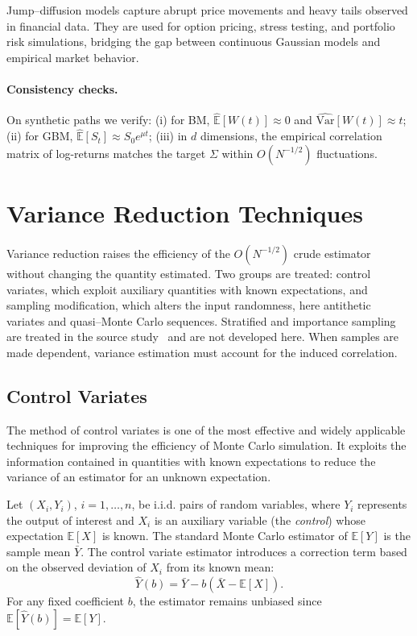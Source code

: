 \begin{remark}[Applications]
Jump--diffusion models capture abrupt price movements and heavy tails observed in financial data.  
They are used for option pricing, stress testing, and portfolio risk simulations, bridging the gap between continuous Gaussian models and empirical market behavior.
\end{remark}

\paragraph{Consistency checks.}
On synthetic paths we verify: (i) for BM, \( \hat{\mathbb E}[W(t)]\approx0\) and \(\widehat{\mathrm{Var}}[W(t)]\approx t\);
(ii) for GBM, \( \hat{\mathbb E}[S_t]\approx S_0 e^{\mu t}\);
(iii) in \(d\) dimensions, the empirical correlation matrix of log-returns matches the target \(\Sigma\) within \(O(N^{-1/2})\) fluctuations.


\section{Variance Reduction Techniques}\label{sec:mc-variance-reduction}

Variance reduction raises the efficiency of the $O(N^{-1/2})$ crude estimator without changing the quantity estimated. Two groups are treated: control variates, which exploit auxiliary quantities with known expectations, and sampling modification, which alters the input randomness, here antithetic variates and quasi--Monte Carlo sequences. Stratified and importance sampling are treated in the source study~\cite{team3} and are not developed here. When samples are made dependent, variance estimation must account for the induced correlation.
\subsection{Control Variates} 

The method of control variates is one of the most effective and widely applicable techniques for improving the efficiency of Monte Carlo simulation. It exploits the information contained in quantities with known expectations to reduce the variance of an estimator for an unknown expectation.  

\begin{definition}\label{def:control-variate}
Let \((X_i, Y_i)\), \(i = 1, \dots, n\), be i.i.d. pairs of random variables, where \(Y_i\) represents the output of interest and \(X_i\) is an auxiliary variable (the \emph{control}) whose expectation \(\mathbb{E}[X]\) is known.  
The standard Monte Carlo estimator of \(\mathbb{E}[Y]\) is the sample mean \(\bar{Y}\).  
The control variate estimator introduces a correction term based on the observed deviation of \(X_i\) from its known mean:
\[
\widehat{Y}(b) = \bar{Y} - b(\bar{X} - \mathbb{E}[X]).
\]
For any fixed coefficient \(b\), the estimator remains unbiased since \(\mathbb{E}[\widehat{Y}(b)] = \mathbb{E}[Y]\).
\end{definition}


